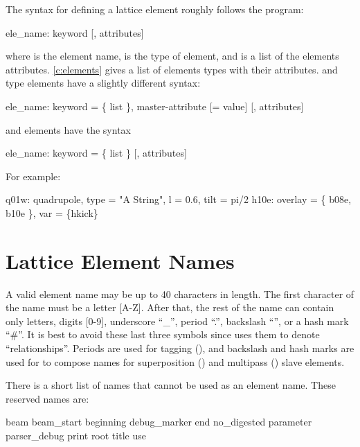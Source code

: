 The syntax for defining a lattice element roughly follows the
\mad\cite{b:maduser} program:
\begin{example}
  ele_name: keyword [, attributes]
\end{example}
where  is the element name,  is the type of
element, and  is a list of the elements
attributes. \cref{c:elements} gives a list of elements types with
their attributes.
 and  type elements have a slightly different syntax:
\begin{example}
  ele_name: keyword = \{ list \}, master-attribute [= value] [, attributes]
\end{example}
and  elements have the syntax
\begin{example}
  ele_name: keyword = \{ list \} [, attributes]
\end{example}  
For example:
\begin{example}
  q01w: quadrupole, type = "A String", l = 0.6, tilt = pi/2
  h10e: overlay = \{ b08e, b10e \}, var = \{hkick\}
\end{example}

\section{Lattice Element Names}
\label{s:ele.names}

A valid element name may be up to 40 characters in length. The first
character of the name must be a letter [A-Z]. After that, the rest of
the name can contain only letters, digits [0-9], underscore ``_'',
period ``.'', backslash ``\B'', or a hash mark ``\#''. It is best to
avoid these last three symbols since \bmad uses them to denote
``relationships''.  Periods are used for tagging (), and
backslash and hash marks are used for to compose names for
superposition () and multipass ()
slave elements.

There is a short list of names that cannot be used as an element name. 
These reserved names are:
\begin{example}
  beam
  beam_start
  beginning
  debug_marker
  end
  no_digested
  parameter
  parser_debug
  print
  root
  title
  use
\end{example}

